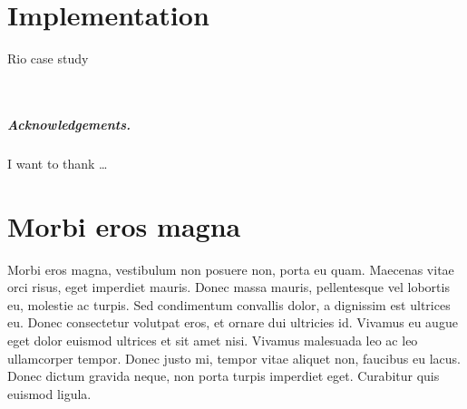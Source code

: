 \documentclass[a4paper,UKenglish]{lipics-v2016}
\begin{document}
\section{Implementation}
\label{sec:impl}

Rio case study

~
\newpage

\subparagraph*{Acknowledgements.}

I want to thank \dots

\appendix
\section{Morbi eros magna}

Morbi eros magna, vestibulum non posuere non, porta eu quam. Maecenas vitae orci risus, eget imperdiet mauris. Donec massa mauris, pellentesque vel lobortis eu, molestie ac turpis. Sed condimentum convallis dolor, a dignissim est ultrices eu. Donec consectetur volutpat eros, et ornare dui ultricies id. Vivamus eu augue eget dolor euismod ultrices et sit amet nisi. Vivamus malesuada leo ac leo ullamcorper tempor. Donec justo mi, tempor vitae aliquet non, faucibus eu lacus. Donec dictum gravida neque, non porta turpis imperdiet eget. Curabitur quis euismod ligula. 






\end{document}
